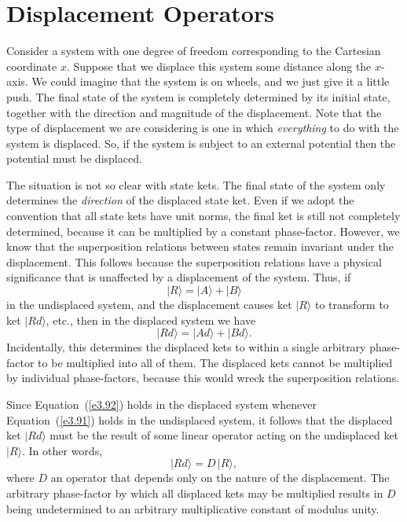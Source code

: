 \section{Displacement Operators}\label{s3.8}
Consider a system with one degree of freedom corresponding to the Cartesian
coordinate $x$. Suppose that we displace this system some distance along the $x$-axis.
We could imagine that the system is on wheels, and we just give it a little
push. The final state of the system is completely determined by its initial state,
together with the direction and magnitude of the displacement.
Note that the type of displacement we are considering is one in which
{\em everything}\/ to do with the system is displaced. So, if the system is
subject to an external potential then the potential must be  displaced.

The situation is not so clear with state kets. The final state
of the system only determines the {\em direction}\/ of the displaced state ket. Even if
we adopt the  convention that all state kets have unit norms, the final ket is
still not completely determined, because it can be multiplied by a constant phase-factor. However, we know that the superposition relations between states 
remain invariant under the displacement. This follows because the superposition
relations have a physical significance that is unaffected by a displacement of
the system. 
Thus, if 
\begin{equation}\label{e3.91}
|R\rangle = |A\rangle + |B\rangle
\end{equation}
in the undisplaced system, and the displacement causes ket $|R\rangle$ to
transform to ket $|Rd\rangle$, {\rm etc}., then in the displaced system we have
\begin{equation}\label{e3.92}
|Rd\rangle = |Ad\rangle + |Bd\rangle.
\end{equation}
Incidentally, this determines the displaced kets to within a single arbitrary phase-factor to be multiplied into all of them. The displaced kets cannot be multiplied by 
individual phase-factors, because this would wreck the superposition relations. 

Since Equation~(\ref{e3.92}) holds in the displaced system whenever Equation~(\ref{e3.91}) holds in the
undisplaced system, it follows that the displaced ket $|Rd\rangle$ must be the
result of some linear operator acting on the undisplaced ket
$|R\rangle$. In other
words,
\begin{equation}
|R d\rangle = D \,|R\rangle,
\end{equation}
where $D$ an  operator that depends only on the
nature of the displacement. The arbitrary phase-factor by which all
displaced kets may be multiplied results in $D$ being undetermined to an arbitrary
multiplicative constant of modulus unity. 

